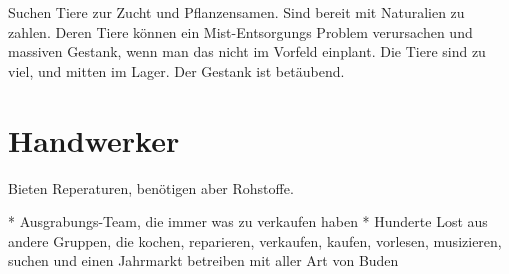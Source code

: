 \documentclass{book}
\begin{document}
Suchen Tiere zur Zucht und Pflanzensamen. Sind bereit mit Naturalien zu zahlen. Deren Tiere können ein Mist-Entsorgungs Problem verursachen und massiven Gestank, wenn man das nicht im Vorfeld einplant. Die Tiere sind zu viel, und mitten im Lager. Der Gestank ist betäubend.


\section{Handwerker}

Bieten Reperaturen, benötigen aber Rohstoffe.


* Ausgrabungs-Team, die immer was zu verkaufen haben
* Hunderte Lost aus andere Gruppen, die kochen, reparieren, verkaufen, kaufen, vorlesen, musizieren, suchen und einen Jahrmarkt betreiben mit aller Art von Buden
\end{document}
